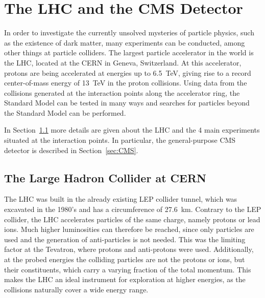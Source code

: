 \graphicspath{{chapt_dutch/}{intro/}{detector/}}

\renewcommand\evenpagerightmark{{\scshape\small Chapter 3}}
\renewcommand\oddpageleftmark{{\scshape\small The LHC and the CMS Detector}}

\hyphenation{}

\chapter{The LHC and the CMS Detector}
\label{ch3}

In order to investigate the currently unsolved mysteries of particle physics, such as the existence of dark matter, many experiments can be conducted, among other things at particle colliders. The largest particle accelerator in the world is the \ac{LHC}, located at the \ac{CERN} in Geneva, Switzerland. At this accelerator, protons are being accelerated at energies up to \SI{6.5}{TeV}, giving rise to a record center-of-mass energy of \SI{13}{TeV} in the proton collisions. Using data from the collisions generated at the interaction points along the accelerator ring, the Standard Model can be tested in many ways and searches for particles beyond the Standard Model can be performed. 

In Section~\ref{sec:lhc} more details are given about the \ac{LHC} and the 4 main experiments situated at the interaction points. In particular, the general-purpose \ac{CMS} detector is described in Section~\ref{sec:CMS}.

\section{The Large Hadron Collider at CERN} 
\label{sec:lhc}

The \ac{LHC} was built in the already existing \ac{LEP} collider tunnel, which was excavated in the 1980's and has a circumference of 27.6~km. Contrary to the \ac{LEP} collider, the \ac{LHC} accelerates particles of the same charge, namely protons or lead ions. Much higher luminosities can therefore be reached, since only particles are used and the generation of anti-particles is not needed. This was the limiting factor at the Tevatron, where protons and anti-protons were used. Additionally, at the probed energies the colliding particles are not the protons or ions, but their constituents, which carry a varying fraction of the total momentum. %
This makes the \ac{LHC} an ideal instrument for exploration at higher energies, as the collisions naturally cover a wide energy range.

